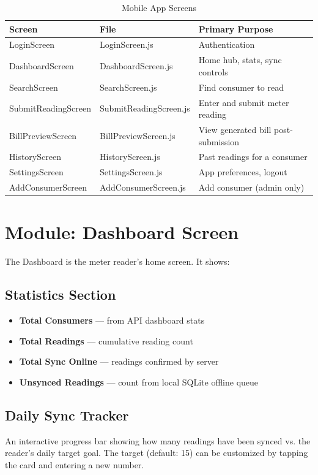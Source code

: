 \documentclass[12pt, a4paper]{report}
\newenvironment{featurelist}{%
    \begin{itemize}[leftmargin=1.5em, itemsep=2pt, parsep=0pt]
}{%
    \end{itemize}
}
\begin{document}
\begin{table}[H]
\centering
\caption{Mobile App Screens}
\begin{tabularx}{\textwidth}{>{\ttfamily}l l X}
\toprule
\textbf{Screen} & \textbf{File} & \textbf{Primary Purpose} \\
\midrule
LoginScreen & LoginScreen.js & Authentication \\
DashboardScreen & DashboardScreen.js & Home hub, stats, sync controls \\
SearchScreen & SearchScreen.js & Find consumer to read \\
SubmitReadingScreen & SubmitReadingScreen.js & Enter and submit meter reading \\
BillPreviewScreen & BillPreviewScreen.js & View generated bill post-submission \\
HistoryScreen & HistoryScreen.js & Past readings for a consumer \\
SettingsScreen & SettingsScreen.js & App preferences, logout \\
AddConsumerScreen & AddConsumerScreen.js & Add consumer (admin only) \\
\bottomrule
\end{tabularx}
\end{table}

\section{Module: Dashboard Screen}

The Dashboard is the meter reader's home screen. It shows:

\subsection{Statistics Section}
\begin{featurelist}
    \item \textbf{Total Consumers} — from API dashboard stats
    \item \textbf{Total Readings} — cumulative reading count
    \item \textbf{Total Sync Online} — readings confirmed by server
    \item \textbf{Unsynced Readings} — count from local SQLite offline queue
\end{featurelist}

\subsection{Daily Sync Tracker}
An interactive progress bar showing how many readings have been synced vs. the reader's daily target goal. The target (default: 15) can be customized by tapping the card and entering a new number.
\end{document}
